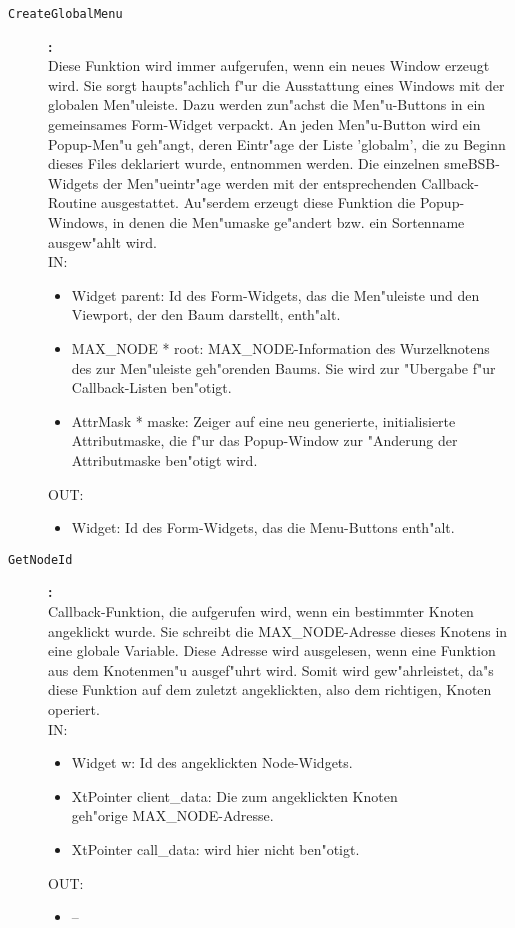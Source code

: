 \begin{description}
\item[\tt CreateGlobalMenu]{\bf :\\}
Diese Funktion wird immer aufgerufen, wenn ein neues Window erzeugt wird. Sie sorgt haupts"achlich f"ur die Ausstattung eines Windows mit der globalen Men"uleiste. Dazu werden zun"achst die Men"u-Buttons in ein gemeinsames Form-Widget verpackt. An jeden Men"u-Button wird ein Popup-Men"u geh"angt, deren Eintr"age der Liste 'globalm', die zu Beginn dieses Files deklariert wurde, entnommen werden. Die einzelnen smeBSB-Widgets der Men"ueintr"age werden mit der entsprechenden Callback-Routine ausgestattet. Au"serdem erzeugt diese Funktion die Popup-Windows, in denen die Men"umaske ge"andert bzw. ein Sortenname ausgew"ahlt wird. \\
IN:
\begin{itemize}
   \item Widget parent:   Id des Form-Widgets, das die Men"uleiste und den Viewport, der den Baum darstellt, enth"alt. \item MAX\_NODE * root: MAX\_NODE-Information des Wurzelknotens des zur Men"uleiste geh"orenden Baums. Sie wird zur "Ubergabe f"ur Callback-Listen ben"otigt. \item AttrMask * maske: Zeiger auf eine neu generierte, initialisierte Attributmaske, die f"ur das Popup-Window zur "Anderung der Attributmaske ben"otigt wird.
\end{itemize}
OUT:
\begin{itemize}
   \item Widget: Id des Form-Widgets, das die Menu-Buttons enth"alt.
\end{itemize}

\item[\tt GetNodeId]{\bf :\\}
Callback-Funktion, die aufgerufen wird, wenn ein bestimmter Knoten angeklickt wurde. Sie schreibt die MAX\_NODE-Adresse dieses Knotens in eine globale Variable. Diese Adresse wird ausgelesen, wenn eine Funktion aus dem Knotenmen"u ausgef"uhrt wird. Somit wird gew"ahrleistet, da"s diese Funktion auf dem zuletzt angeklickten, also dem richtigen, Knoten operiert. \\
IN:
\begin{itemize}
   \item Widget w:      Id des angeklickten Node-Widgets. \item XtPointer client\_data: Die zum angeklickten Knoten\\
 geh"orige MAX\_NODE-Adresse. \item XtPointer call\_data:   wird hier nicht ben"otigt.
\end{itemize}
OUT:
\begin{itemize}
   \item --
\end{itemize}


\end{description}
